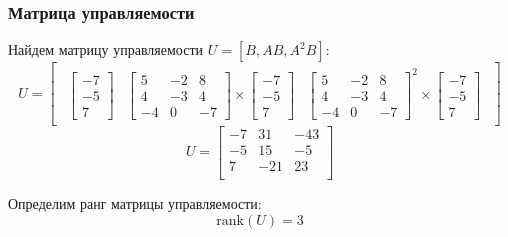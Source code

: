 \subsubsection{Матрица управляемости}
Найдем матрицу управляемости $U = [B, AB, A^2B]$: 
\begin{equation}
    U = \begin{bmatrix} 
        \begin{array}{c|c|c}
            \begin{bmatrix}
                -7 \\
                -5 \\
                7
            \end{bmatrix} & 
            \begin{bmatrix}
                5 & -2 & 8 \\
                4 & -3 & 4 \\
                -4 & 0 & -7
            \end{bmatrix} \times 
            \begin{bmatrix}
                -7 \\
                -5 \\
                7
            \end{bmatrix} &
            \begin{bmatrix}
                5 & -2 & 8 \\
                4 & -3 & 4 \\
                -4 & 0 & -7
            \end{bmatrix}^2 \times
            \begin{bmatrix}
                -7 \\
                -5 \\
                7
            \end{bmatrix}
        \end{array}   
    \end{bmatrix}
\end{equation}
\begin{equation}
    U = \begin{bmatrix}
        -7 & 31 & -43 \\
        -5 & 15 & -5 \\
        7 & -21 & 23 \\
    \end{bmatrix}
\end{equation}

Определим ранг матрицы управляемости:
\begin{equation}
    \text{rank}(U) = 3
\end{equation}

